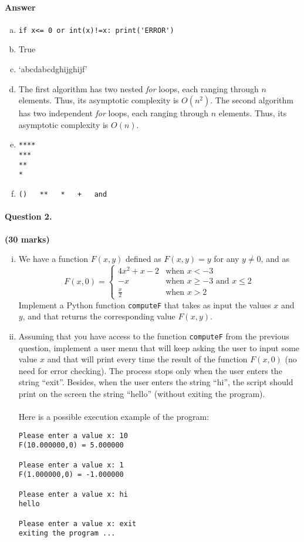 \documentclass[12pt]{article}
\begin{document}
\paragraph{Answer}
\begin{enumerate}[(a)]
\item \verb|if x<= 0 or int(x)!=x: print('ERROR')|
\item True
\item `abcdabcdghijghijf'
\item The first algorithm has two nested \textit{for} loops, each ranging through $n$ elements. Thus, its asymptotic complexity is $O(n^2)$. The second algorithm has two independent \textit{for} loops, each ranging through $n$ elements. Thus, its asymptotic complexity is $O(n)$.
\item \begin{verbatim}
****
***
**
*
\end{verbatim}
\item \begin{verbatim}
()   **   *   +   and
\end{verbatim}
\end{enumerate}\clearpage
\paragraph{Question 2.} \hfill {\bf (30 marks)}
\begin{enumerate}[(i)]
\item We have a function $F(x,y)$ defined as $F(x,y)=y$ for any $y\neq 0$, and as
\begin{equation*}
F(x,0)=
\begin{cases}
4x^2+x-2 &\text{when }x<-3\\-x &\text{when }x\geq -3 \text{ and } x\leq 2\\\frac{x}{2} &\text{when }x>2
\end{cases}
\end{equation*}
Implement a Python function \texttt{computeF} that takes as input the values $x$ and $y$, and that returns the corresponding value $F(x,y)$.
\item Assuming that you have access to the function \texttt{computeF} from the previous question, implement a user menu that will keep asking the user to input some value $x$ and that will print every time the result of the function $F(x,0)$ (no need for error checking). The process stops only when the user enters the string ``exit''. Besides, when the user enters the string ``hi'', the script should print on the screen the string ``hello'' (without exiting the program).\\\\Here is a possible execution example of the program:
\begin{verbatim}
Please enter a value x: 10
F(10.000000,0) = 5.000000

Please enter a value x: 1
F(1.000000,0) = -1.000000

Please enter a value x: hi
hello

Please enter a value x: exit
exiting the program ...
\end{verbatim}
\end{enumerate}
\end{document}
